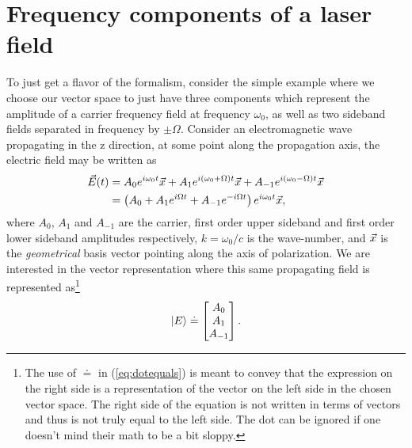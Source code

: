\section{Frequency components of a laser field}
\label{sec:freqspace}
To just get a flavor of the formalism, consider the simple example where we choose our vector space to just have three components which represent the amplitude of a carrier frequency field at frequency $\omega_0$, as well as two sideband fields separated in frequency by $\pm\Omega$. %
Consider an electromagnetic wave propagating in the z direction, at some point along the propagation axis, the electric field may be written as
\begin{align*}
\vec{E}(t) &= A_0 e^{i\omega_0t}\vec{x} + A_1e^{i(\omega_0+\Omega)t}\vec{x} + A_{-1}e^{i(\omega_0-\Omega)t}\vec{x}\\
&= \left( A_0 + A_1 e^{i\Omega t}+A_{-1}e^{-i\Omega t}\right) e^{i\omega_0 t}\vec{x},
\end{align*}
where $A_0$, $A_1$ and $A_{-1}$ are the carrier, first order upper sideband and first order lower sideband amplitudes respectively, $k=\omega_0/c$ is the wave-number, and $\vec{x}$ is the \emph{geometrical} basis vector pointing along the axis of polarization. %
We are interested in the vector representation where this same propagating field is represented as\footnote{The use of $\doteq$ in (\ref{eq:dotequals}) is meant to convey that the expression on the right side is a representation of the vector on the left side in the chosen vector space. %
The right side of the equation is not written in terms of vectors and thus is not truly equal to the left side. %
The dot can be ignored if one doesn't mind their math to be a bit sloppy.} 
\begin{equation}
\label{eq:dotequals}
\left| E \right> \doteq \left[\begin{matrix} A_0 \\ A_1 \\ A_{-1} \end{matrix}\right].
\end{equation}

